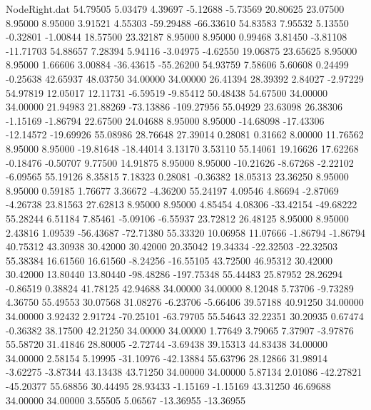 \begin{filecontents}{NodeRight.dat}
  54.79505    5.03479    4.39697    -5.12688   -5.73569   20.80625   23.07500    8.95000    8.95000    3.91521    4.55303  -59.29488  -66.33610
  54.83583    7.95532    5.13550    -0.32801   -1.00844   18.57500   23.32187    8.95000    8.95000    0.99468    3.81450   -3.81108  -11.71703
  54.88657    7.28394    5.94116    -3.04975   -4.62550   19.06875   23.65625    8.95000    8.95000    1.66606    3.00884  -36.43615  -55.26200
  54.93759    7.58606    5.60608     0.24499   -0.25638   42.65937   48.03750   34.00000   34.00000   26.41394   28.39392    2.84027   -2.97229
  54.97819   12.05017   12.11731    -6.59519   -9.85412   50.48438   54.67500   34.00000   34.00000   21.94983   21.88269  -73.13886 -109.27956
  55.04929   23.63098   26.38306    -1.15169   -1.86794   22.67500   24.04688    8.95000    8.95000  -14.68098  -17.43306  -12.14572  -19.69926
  55.08986   28.76648   27.39014     0.28081    0.31662    8.00000   11.76562    8.95000    8.95000  -19.81648  -18.44014    3.13170    3.53110
  55.14061   19.16626   17.62268    -0.18476   -0.50707    9.77500   14.91875    8.95000    8.95000  -10.21626   -8.67268   -2.22102   -6.09565
  55.19126    8.35815    7.18323     0.28081   -0.36382   18.05313   23.36250    8.95000    8.95000    0.59185    1.76677    3.36672   -4.36200
  55.24197    4.09546    4.86694    -2.87069   -4.26738   23.81563   27.62813    8.95000    8.95000    4.85454    4.08306  -33.42154  -49.68222
  55.28244    6.51184    7.85461    -5.09106   -6.55937   23.72812   26.48125    8.95000    8.95000    2.43816    1.09539  -56.43687  -72.71380
  55.33320   10.06958   11.07666    -1.86794   -1.86794   40.75312   43.30938   30.42000   30.42000   20.35042   19.34334  -22.32503  -22.32503
  55.38384   16.61560   16.61560    -8.24256  -16.55105   43.72500   46.95312   30.42000   30.42000   13.80440   13.80440  -98.48286 -197.75348
  55.44483   25.87952   28.26294    -0.86519    0.38824   41.78125   42.94688   34.00000   34.00000    8.12048    5.73706   -9.73289    4.36750
  55.49553   30.07568   31.08276    -6.23706   -5.66406   39.57188   40.91250   34.00000   34.00000    3.92432    2.91724  -70.25101  -63.79705
  55.54643   32.22351   30.20935     0.67474   -0.36382   38.17500   42.21250   34.00000   34.00000    1.77649    3.79065    7.37907   -3.97876
  55.58720   31.41846   28.80005    -2.72744   -3.69438   39.15313   44.83438   34.00000   34.00000    2.58154    5.19995  -31.10976  -42.13884
  55.63796   28.12866   31.98914    -3.62275   -3.87344   43.13438   43.71250   34.00000   34.00000    5.87134    2.01086  -42.27821  -45.20377
  55.68856   30.44495   28.93433    -1.15169   -1.15169   43.31250   46.69688   34.00000   34.00000    3.55505    5.06567  -13.36955  -13.36955

\end{filecontents}
